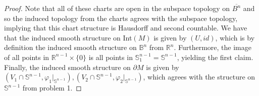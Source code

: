 \documentclass{article}
\newcommand{\bb}[1]{\mathbb{#1}}
\begin{document}
\begin{proof}
  Note that all of these charts are open in the subspace topology on $\overline{B^{n}}$ and so the induced topology from the charts agrees with the subspace topology, implying that this chart structure is Hausdorff and second countable. We have that the induced smooth structure on Int$(M)$ is given by $(U, id)$, which is by definition the induced smooth structure on $\bb{B}^{n}$ from $\bb{R}^{n}$. Furthermore, the image of all points in $\bb{R}^{n-1}\times \{0\}$ is all points in $\bb{S}^{n-1}_{1} = \bb{S}^{n-1}$, yielding the first claim. Finally, the induced smooth structure on $\partial M$ is given by $(V_{1}\cap \bb{S}^{n-1}, \varphi_{1}|_{\bb{S}^{n-1}}), (V_{2}\cap \bb{S}^{n-1}, \varphi_{2}|_{\bb{S}^{n-1}})$, which agrees with the structure on $\bb{S}^{n-1}$ from problem 1. 
\end{proof}
\end{document}
